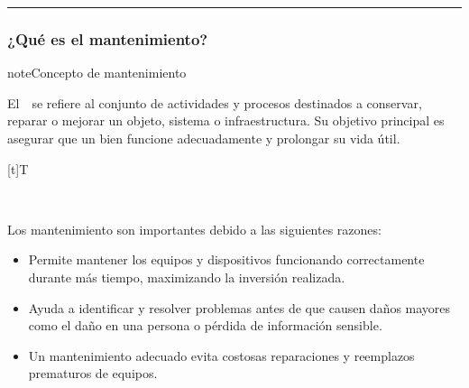 \documentclass[letterpaper,10pt,spanish]{sphinxmanual}
\let\sphinxpxdimen\pdfpxdimen\else\newdimen\sphinxpxdimen
\begin{document}
\bigskip\hrule\bigskip



\subsubsection{¿Qué es el mantenimiento?}
\label{\detokenize{1_guias/10informatica/G1004:que-es-el-mantenimiento}}
\begin{sphinxadmonition}{note}{Concepto de mantenimiento}

\sphinxAtStartPar
El  se refiere al conjunto de actividades y procesos destinados a conservar, reparar o mejorar un objeto, sistema o infraestructura. Su objetivo principal es asegurar que un bien funcione adecuadamente y prolongar su vida útil.


\begin{savenotes}\sphinxattablestart
\sphinxthistablewithglobalstyle
\centering
\begin{tabulary}{\linewidth}[t]{T}
\sphinxtoprule
\sphinxtableatstartofbodyhook

\begin{sphinxfigure-in-table}
\centering
\capstart
\noindent\sphinxincludegraphics[width=400\sphinxpxdimen]{{image014}.png}
\label{\detokenize{1_guias/10informatica/G1004:id1}}\end{sphinxfigure-in-table}\relax
\\
\sphinxbottomrule
\end{tabulary}
\sphinxtableafterendhook\par
\sphinxattableend\end{savenotes}

\sphinxAtStartPar
Los mantenimiento son importantes debido a las siguientes razones:
\begin{itemize}
\item {} 
\sphinxAtStartPar
{} Permite mantener los equipos y dispositivos funcionando correctamente durante más tiempo, maximizando la inversión realizada.

\item {} 
\sphinxAtStartPar
{} Ayuda a identificar y resolver problemas antes de que causen daños mayores como el daño en una persona o pérdida de información sensible.

\item {} 
\sphinxAtStartPar
{} Un mantenimiento adecuado evita costosas reparaciones y reemplazos prematuros de equipos.


\end{itemize}
\end{sphinxadmonition}
\end{document}

